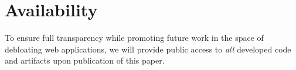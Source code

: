 \section{Availability}

To ensure full transparency while promoting future work in the space of debloating web applications, we will provide public access to \emph{all} developed code and artifacts upon publication of this paper.